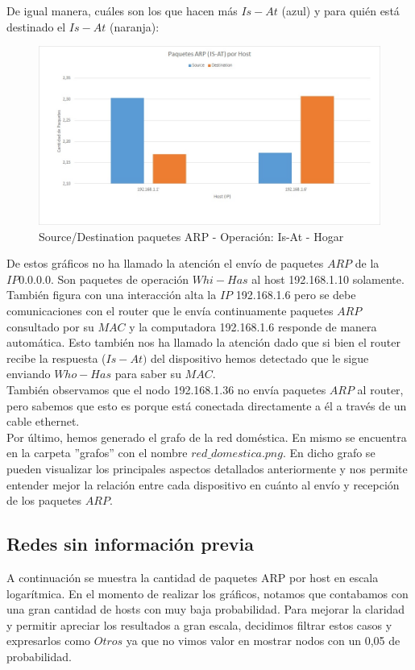 De igual manera, cuáles son los que hacen más $Is-At$ (azul) y para quién está destinado el $Is-At$ (naranja):

\begin{figure}[h!]
\centering
\includegraphics[scale=0.5]{./img/arp_isAt_casa.jpg}
\caption{Source/Destination paquetes ARP - Operación: Is-At - Hogar}
\end{figure}

De estos gráficos no ha llamado la atención el envío de paquetes $ARP$ de la $IP 0.0.0.0$. Son paquetes de operación $Whi-Has$ al host
192.168.1.10 solamente. También figura con una interacción alta la $IP$ 192.168.1.6 pero se debe comunicaciones con el router que le envía
continuamente paquetes $ARP$ consultado por su $MAC$ y la computadora 192.168.1.6 responde de manera automática. Esto también nos ha llamado la 
atención dado que si bien el router recibe la respuesta ($Is-At)$ del dispositivo hemos detectado que le sigue enviando $Who-Has$ para saber su $MAC$.\\

También observamos que el nodo 192.168.1.36 no envía paquetes $ARP$ al router, pero sabemos que esto es porque está conectada directamente
a él a través de un cable ethernet.\\

Por último, hemos generado el grafo de la red doméstica. En mismo se encuentra en la carpeta ”grafos” con el nombre $red\_domestica.png$. 
En dicho grafo se pueden visualizar los principales aspectos detallados anteriormente y nos permite entender mejor la relación entre cada 
dispositivo en cuánto al envío y recepción de los paquetes $ARP$.

\subsection{Redes sin información previa}
A continuación se muestra la cantidad de paquetes ARP por host en escala logarítmica. 
En el momento de realizar los gráficos, notamos que contabamos con una gran cantidad de hosts con muy baja probabilidad. 
Para mejorar la claridad y permitir apreciar los resultados a gran escala, decidimos filtrar estos casos y expresarlos como $Otros$ ya que 
no vimos valor en mostrar nodos con un 0,05 de probabilidad.\\


